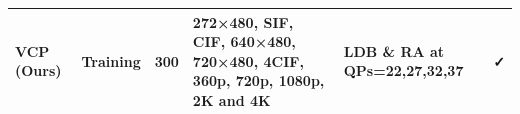 \begin{tabular}{llllll}
\toprule
VCP (Ours) & Training & 300 & 272×480, SIF, CIF, 640×480, 720×480, 4CIF, 360p, 720p, 1080p, 2K and 4K & LDB \& RA at QPs=22,27,32,37 & ✓ \\
\midrule
\bottomrule
\end{tabular}
